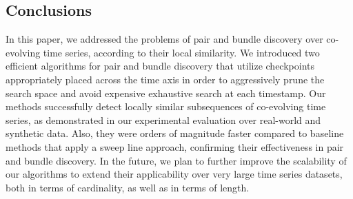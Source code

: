 \subsection{Conclusions}
\label{sec:conclusions}

In this paper, we addressed the problems of pair and bundle discovery over co-evolving time series, according to their local similarity. We introduced two efficient algorithms for pair and bundle discovery that utilize checkpoints appropriately placed across the time axis in order to aggressively prune the search space and avoid expensive exhaustive search at each timestamp. Our methods successfully detect locally similar subsequences of co-evolving time series, as demonstrated in our experimental evaluation over real-world and synthetic data. Also, they were orders of magnitude faster compared to baseline methods that apply a sweep line approach, confirming their effectiveness in pair and bundle discovery. In the future, we plan to further improve the scalability of our algorithms to extend their applicability over very large time series datasets, both in terms of cardinality, as well as in terms of length.

